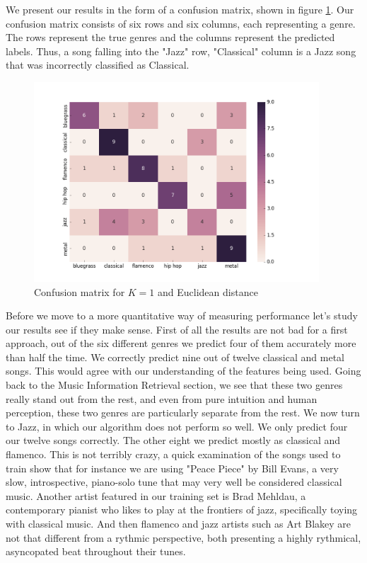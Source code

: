 \documentclass[12pt]{article}
\begin{document}
We present our results in the form of a confusion matrix, shown in figure \ref{naiveKNN}. Our confusion matrix consists of six rows and six columns, each representing a genre. The rows represent the true genres and the columns represent the predicted labels. Thus, a song falling into the "Jazz" row, "Classical" column is a Jazz song that was incorrectly classified as Classical.
\medskip
\begin{figure}
\centering
  \includegraphics[width=0.95\textwidth]{naiveKNN.png}
  \caption{Confusion matrix for $K=1$ and Euclidean distance}
  \label{naiveKNN}
\end{figure}
\medskip
Before we move to a more quantitative way of measuring performance let's study our results see if they make sense. First of all the results are not bad for a first approach, out of the six different genres we predict four of them accurately more than half the time. We correctly predict nine out of twelve classical and metal songs. This would agree with our understanding of the features being used. Going back to the Music Information Retrieval section, we see that these two genres really stand out from the rest, and even from pure intuition and human perception, these two genres are particularly separate from the rest. We now turn to Jazz, in which our algorithm does not perform so well. We only predict four our twelve songs correctly. The other eight we predict mostly as classical and flamenco. This is not terribly crazy, a quick examination of the songs used to train show that for instance we are using "Peace Piece" by Bill Evans, a very slow, introspective, piano-solo tune that may very well be considered classical music. Another artist featured in our training set is Brad Mehldau, a contemporary pianist who likes to play at the frontiers of jazz, specifically toying with classical music. And then flamenco and jazz artists such as Art Blakey are not that different from a rythmic perspective, both presenting a highly rythmical, asyncopated beat throughout their tunes.
\medskip
\end{document}
